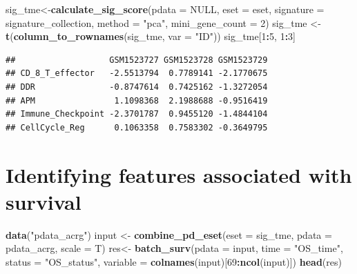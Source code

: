 \documentclass[
  12pt,
]{book}
\newenvironment{Shaded}{\begin{snugshade}}{\end{snugshade}}
\newcommand{\AttributeTok}[1]{\textcolor[rgb]{0.13,0.29,0.53}{#1}}
\newcommand{\ConstantTok}[1]{\textcolor[rgb]{0.56,0.35,0.01}{#1}}
\newcommand{\DecValTok}[1]{\textcolor[rgb]{0.00,0.00,0.81}{#1}}
\newcommand{\FunctionTok}[1]{\textcolor[rgb]{0.13,0.29,0.53}{\textbf{#1}}}
\newcommand{\NormalTok}[1]{#1}
\newcommand{\OtherTok}[1]{\textcolor[rgb]{0.56,0.35,0.01}{#1}}
\newcommand{\SpecialCharTok}[1]{\textcolor[rgb]{0.81,0.36,0.00}{\textbf{#1}}}
\newcommand{\StringTok}[1]{\textcolor[rgb]{0.31,0.60,0.02}{#1}}
\theoremstyle{definition}
\theoremstyle{definition}
\theoremstyle{definition}
\theoremstyle{definition}
\theoremstyle{remark}
\begin{document}
\begin{Shaded}
\begin{Highlighting}[]
\NormalTok{sig\_tme}\OtherTok{\textless{}{-}}\FunctionTok{calculate\_sig\_score}\NormalTok{(}\AttributeTok{pdata           =} \ConstantTok{NULL}\NormalTok{,}
                             \AttributeTok{eset            =}\NormalTok{ eset,}
                             \AttributeTok{signature       =}\NormalTok{ signature\_collection,}
                             \AttributeTok{method          =} \StringTok{"pca"}\NormalTok{,}
                             \AttributeTok{mini\_gene\_count =} \DecValTok{2}\NormalTok{)}
\NormalTok{sig\_tme }\OtherTok{\textless{}{-}} \FunctionTok{t}\NormalTok{(}\FunctionTok{column\_to\_rownames}\NormalTok{(sig\_tme, }\AttributeTok{var =} \StringTok{"ID"}\NormalTok{))}
\NormalTok{sig\_tme[}\DecValTok{1}\SpecialCharTok{:}\DecValTok{5}\NormalTok{, }\DecValTok{1}\SpecialCharTok{:}\DecValTok{3}\NormalTok{]}
\end{Highlighting}
\end{Shaded}

\begin{verbatim}
##                   GSM1523727 GSM1523728 GSM1523729
## CD_8_T_effector   -2.5513794  0.7789141 -2.1770675
## DDR               -0.8747614  0.7425162 -1.3272054
## APM                1.1098368  2.1988688 -0.9516419
## Immune_Checkpoint -2.3701787  0.9455120 -1.4844104
## CellCycle_Reg      0.1063358  0.7583302 -0.3649795
\end{verbatim}

\hypertarget{identifying-features-associated-with-survival}{%
\section{Identifying features associated with survival}\label{identifying-features-associated-with-survival}}

\begin{Shaded}
\begin{Highlighting}[]
\FunctionTok{data}\NormalTok{(}\StringTok{"pdata\_acrg"}\NormalTok{)}
\NormalTok{input }\OtherTok{\textless{}{-}} \FunctionTok{combine\_pd\_eset}\NormalTok{(}\AttributeTok{eset =}\NormalTok{ sig\_tme, }\AttributeTok{pdata =}\NormalTok{ pdata\_acrg, }\AttributeTok{scale =}\NormalTok{ T)}
\NormalTok{res}\OtherTok{\textless{}{-}} \FunctionTok{batch\_surv}\NormalTok{(}\AttributeTok{pdata    =}\NormalTok{ input,}
                 \AttributeTok{time     =} \StringTok{"OS\_time"}\NormalTok{, }
                 \AttributeTok{status   =} \StringTok{"OS\_status"}\NormalTok{, }
                 \AttributeTok{variable =} \FunctionTok{colnames}\NormalTok{(input)[}\DecValTok{69}\SpecialCharTok{:}\FunctionTok{ncol}\NormalTok{(input)])}
\FunctionTok{head}\NormalTok{(res)}
\end{Highlighting}
\end{Shaded}
\end{document}
